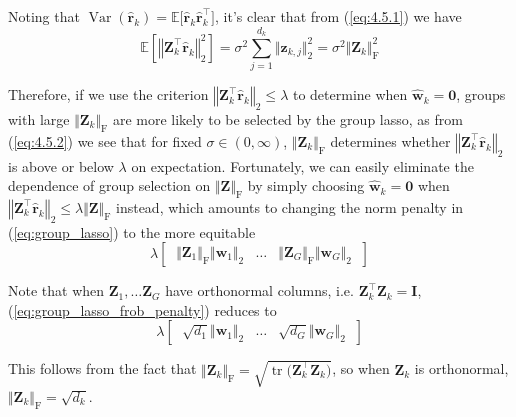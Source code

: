 \documentclass{article}
\numberwithin{equation}{section}
\begin{document}
Noting that $ \operatorname{Var}(\hat{\mathbf{r}}_k) =
\mathbb{E}\big[\hat{\mathbf{r}}_k\hat{\mathbf{r}}_k^\top\big] $, it's clear
that from (\ref{eq:4.5.1}) we have
\begin{equation} \label{eq:4.5.2}
    \mathbb{E}\left[
        \left\Vert\mathbf{Z}_k^\top\hat{\mathbf{r}}_k\right\Vert_2^2
    \right] =
    \sigma^2\sum_{j = 1}^{d_k}\Vert\mathbf{z}_{k, j}\Vert_2^2 =
    \sigma^2\Vert\mathbf{Z}_k\Vert_\text{F}^2
\end{equation}

Therefore, if we use the criterion
$ \left\Vert\mathbf{Z}_k^\top\hat{\mathbf{r}}_k\right\Vert_2 \le \lambda $ to
determine when $ \hat{\mathbf{w}}_k = \mathbf{0} $, groups with large
$ \Vert\mathbf{Z}_k\Vert_\text{F} $ are more likely to be selected by the
group lasso, as from (\ref{eq:4.5.2}) we see that for fixed
$ \sigma \in (0, \infty) $, $ \Vert\mathbf{Z}_k\Vert_\text{F} $ determines
whether $ \left\Vert\mathbf{Z}_k^\top\hat{\mathbf{r}}_k\right\Vert_2 $ is
above or below $ \lambda $ on expectation. Fortunately, we can easily
eliminate the dependence of group selection on
$ \Vert\mathbf{Z}\Vert_\text{F} $ by simply choosing
$ \hat{\mathbf{w}}_k = \mathbf{0} $ when
$ \left\Vert\mathbf{Z}_k^\top\hat{\mathbf{r}}_k\right\Vert_2 \le
\lambda\Vert\mathbf{Z}\Vert_\text{F} $ instead, which amounts to changing the
norm penalty in (\ref{eq:group_lasso}) to the more equitable
\begin{equation} \label{eq:group_lasso_frob_penalty}
    \lambda\begin{bmatrix}
        \ \Vert\mathbf{Z}_1\Vert_\text{F}\Vert\mathbf{w}_1\Vert_2 &
        \ldots &
        \Vert\mathbf{Z}_G\Vert_\text{F}\Vert\mathbf{w}_G\Vert_2 \
    \end{bmatrix}
\end{equation}

Note that when $ \mathbf{Z}_1, \ldots \mathbf{Z}_G $ have orthonormal columns,
i.e. $ \mathbf{Z}_k^\top\mathbf{Z}_k = \mathbf{I} $,
(\ref{eq:group_lasso_frob_penalty}) reduces to
\begin{equation}
    \lambda\begin{bmatrix}
        \ \sqrt{d_1}\Vert\mathbf{w}_1\Vert_2 &
        \ldots &
        \sqrt{d_G}\Vert\mathbf{w}_G\Vert_2 \
    \end{bmatrix}
\end{equation}

This follows from the fact that $ \Vert\mathbf{Z}_k\Vert_\text{F} =
\sqrt{\operatorname{tr}\big(\mathbf{Z}_k^\top\mathbf{Z}_k\big)} $, so when
$ \mathbf{Z}_k $ is orthonormal,
$ \Vert\mathbf{Z}_k\Vert_\text{F} = \sqrt{d_k} $.
\end{document}
